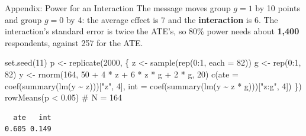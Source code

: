 \documentclass[
  ignorenonframetext,
  aspectratio=169,
]{beamer}
\newenvironment{Shaded}{\begin{snugshade}}{\end{snugshade}}
\newcommand{\AttributeTok}[1]{\textcolor[rgb]{0.40,0.45,0.13}{#1}}
\newcommand{\CommentTok}[1]{\textcolor[rgb]{0.37,0.37,0.37}{#1}}
\newcommand{\DecValTok}[1]{\textcolor[rgb]{0.68,0.00,0.00}{#1}}
\newcommand{\FloatTok}[1]{\textcolor[rgb]{0.68,0.00,0.00}{#1}}
\newcommand{\FunctionTok}[1]{\textcolor[rgb]{0.28,0.35,0.67}{#1}}
\newcommand{\NormalTok}[1]{\textcolor[rgb]{0.00,0.23,0.31}{#1}}
\newcommand{\OtherTok}[1]{\textcolor[rgb]{0.00,0.23,0.31}{#1}}
\newcommand{\SpecialCharTok}[1]{\textcolor[rgb]{0.37,0.37,0.37}{#1}}
\newcommand{\StringTok}[1]{\textcolor[rgb]{0.13,0.47,0.30}{#1}}
\begin{document}
\begin{frame}[fragile]{Appendix: Power for an Interaction}
\label{appendix-power-for-an-interaction}
\footnotesize The message moves group \(g=1\) by 10 points and group
\(g=0\) by 4: the average effect is 7 and the \textbf{interaction} is 6.
The interaction's standard error is twice the ATE's, so 80\% power needs
about \textbf{1,400} respondents, against 257 for the ATE.

\begin{Shaded}
\begin{Highlighting}[]
\FunctionTok{set.seed}\NormalTok{(}\DecValTok{11}\NormalTok{)}
\NormalTok{p }\OtherTok{\textless{}{-}} \FunctionTok{replicate}\NormalTok{(}\DecValTok{2000}\NormalTok{, \{}
\NormalTok{  z }\OtherTok{\textless{}{-}} \FunctionTok{sample}\NormalTok{(}\FunctionTok{rep}\NormalTok{(}\DecValTok{0}\SpecialCharTok{:}\DecValTok{1}\NormalTok{, }\AttributeTok{each =} \DecValTok{82}\NormalTok{))}
\NormalTok{  g }\OtherTok{\textless{}{-}} \FunctionTok{rep}\NormalTok{(}\DecValTok{0}\SpecialCharTok{:}\DecValTok{1}\NormalTok{, }\DecValTok{82}\NormalTok{)}
\NormalTok{  y }\OtherTok{\textless{}{-}} \FunctionTok{rnorm}\NormalTok{(}\DecValTok{164}\NormalTok{, }\DecValTok{50} \SpecialCharTok{+} \DecValTok{4} \SpecialCharTok{*}\NormalTok{ z }\SpecialCharTok{+} \DecValTok{6} \SpecialCharTok{*}\NormalTok{ z }\SpecialCharTok{*}\NormalTok{ g }\SpecialCharTok{+} \DecValTok{2} \SpecialCharTok{*}\NormalTok{ g, }\DecValTok{20}\NormalTok{)}
  \FunctionTok{c}\NormalTok{(}\AttributeTok{ate =} \FunctionTok{coef}\NormalTok{(}\FunctionTok{summary}\NormalTok{(}\FunctionTok{lm}\NormalTok{(y }\SpecialCharTok{\textasciitilde{}}\NormalTok{ z)))[}\StringTok{"z"}\NormalTok{, }\DecValTok{4}\NormalTok{],}
    \AttributeTok{int =} \FunctionTok{coef}\NormalTok{(}\FunctionTok{summary}\NormalTok{(}\FunctionTok{lm}\NormalTok{(y }\SpecialCharTok{\textasciitilde{}}\NormalTok{ z }\SpecialCharTok{*}\NormalTok{ g)))[}\StringTok{"z:g"}\NormalTok{, }\DecValTok{4}\NormalTok{])}
\NormalTok{\})}
\FunctionTok{rowMeans}\NormalTok{(p }\SpecialCharTok{\textless{}} \FloatTok{0.05}\NormalTok{) }\CommentTok{\# N = 164}
\end{Highlighting}
\end{Shaded}

\begin{verbatim}
  ate   int 
0.605 0.149 
\end{verbatim}
\end{frame}
\end{document}
